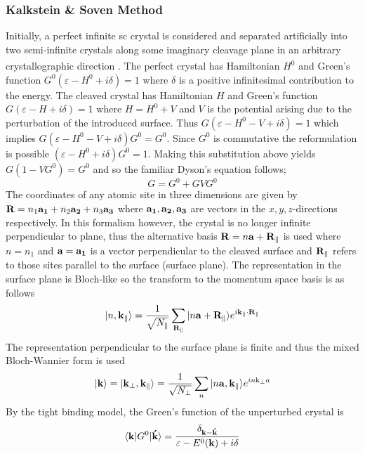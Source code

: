 \documentclass[a4paper, 12pt]{article}
\begin{document}
	\subsubsection{Kalkstein \& Soven Method}\label{k_s}
	Initially, a perfect infinite \gls{sc} crystal is considered and separated artificially into two semi-infinite crystals along some imaginary cleavage plane in an arbitrary crystallographic direction\textcolor{blue}{\textsuperscript{ \cite{phan,KS}}}.
The perfect crystal has Hamiltonian $H^0$ and Green's function $G^0 (\varepsilon-H^0+i\delta)=1$ where $\delta$ is a positive infinitesimal contribution to the energy. The cleaved crystal has Hamiltonian $H$ and Green's function $G(\varepsilon-H+i\delta)=1$ where $H = H^0 + V$ and $V$ is the potential arising due to the perturbation of the introduced surface. Thus $G(\varepsilon-H^0-V+i\delta)=1$ which implies $G(\varepsilon-H^0-V+i\delta)G^0=G^0$. Since $G^0$ is commutative the reformulation is possible $(\varepsilon-H^0+i\delta)G^0=1$. Making this substitution above yields $G(1-VG^0)=G^0$ and so the familiar Dyson's equation follows; 
\begin{equation}\label{dyson}
G=G^0+GVG^0 
\end{equation}
The coordinates of any atomic site in three dimensions are given by ${\bf{R}} = n_1{\bf{a_1}}+n_2{\bf{a_2}}+n_3{\bf{a_3}}$ where $\bf a_1, a_2, a_3$ are vectors in the $x, y,z$-directions respectively. In this formalism however, the crystal is no longer infinite perpendicular to plane, thus the alternative basis ${\bf R} = n{\bf a}+{\bf R_\parallel}$ is used where $n=n_1$ and $\bf a=a_1$ is a vector perpendicular to the cleaved surface and $\bf R_\parallel$ refers to those sites parallel to the surface (surface plane).
The representation in the surface plane is Bloch-like so the transform to the momentum space basis is as follows
\begin{equation}
|n,{\bf k_\parallel} \rangle = \frac{1}{\sqrt{N_\parallel}}\sum_{\bf R_\parallel} |n{\bf a} + {\bf R_\parallel}\rangle e^{i\bf k_\parallel\cdot R_\parallel}
\end{equation}
The representation perpendicular to the surface plane is finite and thus the mixed Bloch-Wannier form is used
\begin{equation}
	|{\bf k} \rangle =|{\bf k_\perp,k_\parallel}\rangle = \frac{1}{\sqrt{N_\perp}}\sum_n |n{\bf a,k_\parallel}\rangle e^{in{\rm{k}}_\perp a}
\end{equation}
By the tight binding model, the Green's function of the unperturbed crystal is
\begin{equation}
\langle {\bf k}|G^0|{\bf \acute{k}} \rangle = \frac{\delta_{\bf k-\acute{k}}}{\varepsilon-E^0 ({\bf k}) +i\delta}
\end{equation}
\end{document}
